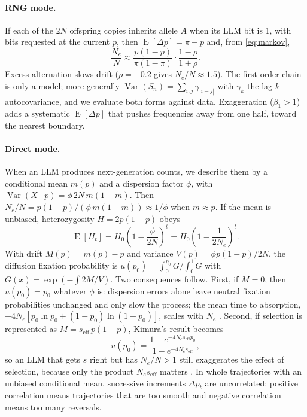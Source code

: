 \documentclass[11pt,a4paper]{article}
\newcommand{\Ne}{N_e}
\newcommand{\Var}{\operatorname{Var}}
\newcommand{\E}{\operatorname{E}}
\begin{document}
\paragraph{RNG mode.}
If each of the $2N$ offspring copies inherits allele $A$ when its LLM bit is 1, with bits requested at the current $p$, then $\E[\Delta p]=\pi-p$ and, from \eqref{eq:markov},
\begin{equation}
\frac{\Ne}{N}\approx \frac{p(1-p)}{\pi(1-\pi)}\cdot\frac{1-\rho}{1+\rho}. \label{eq:rng}
\end{equation}
Excess alternation slows drift ($\rho=-0.2$ gives $\Ne/N\approx1.5$).
The first-order chain is only a model; more generally $\Var(S_n)=\sum_{i,j}\gamma_{|i-j|}$ with $\gamma_k$ the lag-$k$ autocovariance, and we evaluate both forms against data.
Exaggeration ($\beta_1>1$) adds a systematic $\E[\Delta p]$ that pushes frequencies away from one half, toward the nearest boundary.

\paragraph{Direct mode.}
When an LLM produces next-generation counts, we describe them by a conditional mean $m(p)$ and a dispersion factor $\phi$, with $\Var(X\mid p)=\phi\,2N\,m(1-m)$.
Then $\Ne/N=p(1-p)/(\phi\,m(1-m))\approx1/\phi$ when $m\approx p$.
If the mean is unbiased, heterozygosity $H=2p(1-p)$ obeys
\begin{equation}
\E[H_t]=H_0\left(1-\frac{\phi}{2N}\right)^t=H_0\left(1-\frac{1}{2\Ne}\right)^t . \label{eq:het}
\end{equation}
With drift $M(p)=m(p)-p$ and variance $V(p)=\phi p(1-p)/2N$, the diffusion fixation probability is $u(p_0)=\int_0^{p_0}G/\int_0^1G$ with $G(x)=\exp(-\int 2M/V)$.
Two consequences follow.
First, if $M=0$, then $u(p_0)=p_0$ whatever $\phi$ is: dispersion errors alone leave neutral fixation probabilities unchanged and only slow the process; the mean time to absorption, $-4\Ne[p_0\ln p_0+(1-p_0)\ln(1-p_0)]$, scales with $\Ne$ \citep{kimura1969average}.
Second, if selection is represented as $M=s_{\mathrm{eff}}\,p(1-p)$, Kimura's result becomes
\begin{equation}
u(p_0)=\frac{1-e^{-4\Ne s_{\mathrm{eff}} p_0}}{1-e^{-4\Ne s_{\mathrm{eff}}}}, \label{eq:kimura}
\end{equation}
so an LLM that gets $s$ right but has $\Ne/N>1$ still exaggerates the effect of selection, because only the product $\Ne s_{\mathrm{eff}}$ matters \citep{kimura1962probability}.
In whole trajectories with an unbiased conditional mean, successive increments $\Delta p_t$ are uncorrelated; positive correlation means trajectories that are too smooth and negative correlation means too many reversals.
\end{document}
